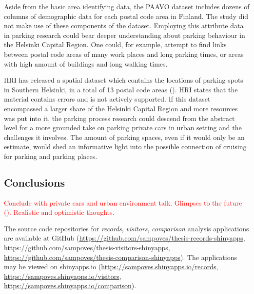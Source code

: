 Aside from the basic area identifying data, the PAAVO dataset includes dozens of columns of demographic data for each postal code area in Finland. The study did not make use of these components of the dataset. Employing this attribute data in parking research could bear deeper understanding about parking behaviour in the Helsinki Capital Region. One could, for example, attempt to find links between postal code areas of many work places and long parking times, or areas with high amount of buildings and long walking times.

HRI has released a spatial dataset which contains the locations of parking spots in Southern Helsinki, in a total of 13 postal code areas (\cite{Helsinginkaupunkiymparistontoimiala2017}). HRI states that the material contains errors and is not actively supported. If this dataset encompassed a larger share of the Helsinki Capital Region and more resources was put into it, the parking process research could descend from the abstract level for a more grounded take on parking private cars in urban setting and the challenges it involves. The amount of parking spaces, even if it would only be an estimate, would shed an informative light into the possible connection of cruising for parking and parking places.

\newpage
\subsection{Conclusions}
\justify


\textcolor{red}{Conclude with private cars and urban environment talk. Glimpses to the future (\cite{ElinaBrandtMatleenaLindeqvist2016}). Realistic and optimistic thoughts.}

The source code repositories for \textit{records}, \textit{visitors}, \textit{comparison} analysis applications are available at GitHub (\textcolor{blue}{\url{https://github.com/sampoves/thesis-records-shinyapps}}, \textcolor{blue}{\url{https://github.com/sampoves/thesis-visitors-shinyapps}}, \textcolor{blue}{\url{https://github.com/sampoves/thesis-comparison-shinyapps}}). The applications may be viewed on shinyapps.io (\textcolor{blue}{\url{https://sampoves.shinyapps.io/records}}, \textcolor{blue}{\url{https://sampoves.shinyapps.io/visitors}}, \textcolor{blue}{\url{https://sampoves.shinyapps.io/comparison}}).